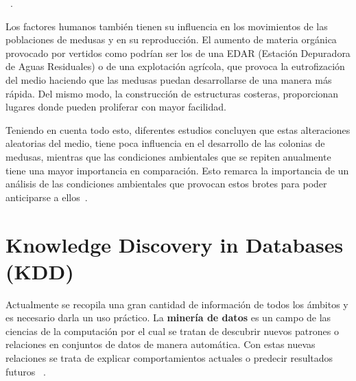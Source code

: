 \textit{}~\cite{canepa_environmental_2017}. 


Los factores humanos también tienen su influencia en los movimientos de las poblaciones de medusas y en su reproducción. 
El aumento de materia orgánica provocado por vertidos como podrían ser los de una EDAR (Estación Depuradora de Aguas Residuales) o de una explotación agrícola, que provoca la eutrofización del medio haciendo que las medusas puedan desarrollarse de una manera más rápida. Del mismo modo, la construcción de estructuras costeras, proporcionan lugares donde pueden proliferar con mayor facilidad.


Teniendo en cuenta todo esto, diferentes estudios concluyen que estas alteraciones aleatorias del medio, tiene poca influencia en el desarrollo de las colonias de medusas, mientras que las condiciones ambientales que se repiten anualmente tiene una mayor importancia en comparación. Esto remarca la importancia de un análisis de las condiciones ambientales que provocan estos brotes para poder anticiparse a ellos~\cite{art:ArticuloCanepa_1}.

\section{Knowledge Discovery in Databases (KDD)}

Actualmente se recopila una gran cantidad de información de todos los ámbitos y es necesario darla un uso práctico. La \textbf{minería de datos} es un campo de las ciencias de la computación por el cual se tratan de descubrir nuevos patrones o relaciones en conjuntos de datos de manera automática. Con estas nuevas relaciones se trata de explicar comportamientos actuales o predecir resultados futuros~ \cite{mineria_tecnicas_herramientas}. 

